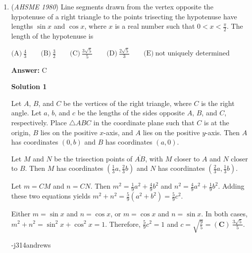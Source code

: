 \begin{enumerate}
 As a piecewise-defined function, we have
 \[f(x)=\begin{cases} 4x+1 & \mathrm{if} \ x \leq \frac{1}{3} \\ x+2 & \mathrm{if} \ \frac{1}{3} < x \leq \frac{2}{3} \\ -2x+4 & \mathrm{if} \ x > \frac{2}{3} \end{cases}.\]~J314andrews ~MRENTHUSIASM

 


	\item (\textit{AHSME 1980}) Line segments drawn from the vertex opposite the hypotenuse of a right triangle to the points trisecting the hypotenuse have lengths $\sin x$ and $\cos x$, where $x$ is a real number such that $0<x<\frac{\pi}{2}$. The length of the hypotenuse is 


 $\text{(A)} \ \frac{4}{3} \qquad  \text{(B)} \ \frac{3}{2} \qquad  \text{(C)} \ \frac{3\sqrt{5}}{5} \qquad  \text{(D)}\ \frac{2\sqrt{5}}{3}\qquad \text{(E)}\ \text{not uniquely determined}$

 \textbf{Answer: }C



\textbf{Solution 1}

Let $A$, $B$, and $C$ be the vertices of the right triangle, where $C$ is the right angle.  Let $a$, $b$, and $c$ be the lengths of the sides opposite $A$, $B$, and $C$, respectively.  Place $\triangle ABC$ in the coordinate plane such that $C$ is at the origin, $B$ lies on the positive $x$-axis, and $A$ lies on the positive $y$-axis.  Then $A$ has coordinates $(0, b)$ and $B$ has coordinates $(a, 0)$. 

 Let $M$ and $N$ be the trisection points of $\overline{AB}$, with $M$ closer to $A$ and $N$ closer to $B$.  Then $M$ has coordinates $\left(\frac{1}{3}a, \frac{2}{3}b\right)$ and $N$ has coordinates $\left(\frac{2}{3}a, \frac{1}{3}b\right)$.

 Let $m = CM$ and $n = CN$.  Then $m^2 = \frac{1}{9}a^2 + \frac{4}{9}b^2$ and $n^2 = \frac{4}{9}a^2 + \frac{1}{9}b^2$.  Adding these two equations yields $m^2 + n^2 = \frac{5}{9}(a^2+b^2) = \frac{5}{9}c^2$.

 Either $m = \sin x$ and $n = \cos x$, or $m = \cos x$ and $n = \sin x$.  In both cases, $m^2 + n^2 = \sin^2 x + \cos^2 x = 1$.  Therefore, $\frac{5}{9}c^2 = 1$ and $c = \sqrt{\frac{9}{5}} = \boxed{(\textbf{C})\ \frac{3\sqrt{5}}{5}}$.

 -j314andrews

 




\end{enumerate}
